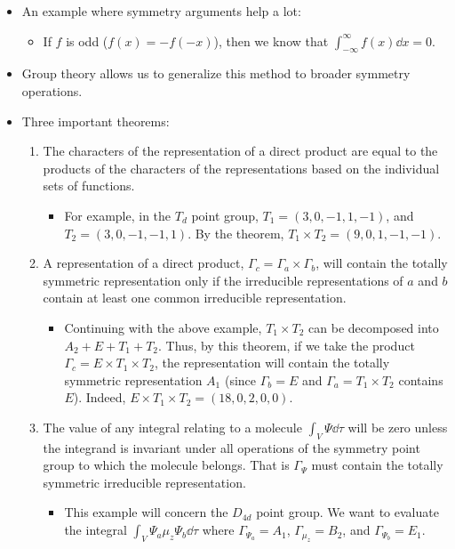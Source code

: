 \documentclass[../notes.tex]{subfiles}
\begin{document}
\begin{itemize}
\begin{itemize}
    \end{itemize}
    \item An example where symmetry arguments help a lot:
    \begin{itemize}
        \item If $f$ is odd ($f(x)=-f(-x)$), then we know that $\int_{-\infty}^\infty f(x)\dd{x}=0$.
    \end{itemize}
    \item Group theory allows us to generalize this method to broader symmetry operations.
    \item Three important theorems:
    \begin{enumerate}
        \item The characters of the representation of a direct product are equal to the products of the characters of the representations based on the individual sets of functions.
        \begin{itemize}
            \item For example, in the $T_d$ point group, $T_1=(3,0,-1,1,-1)$, and $T_2=(3,0,-1,-1,1)$. By the theorem, $T_1\times T_2=(9,0,1,-1,-1)$.
        \end{itemize}
        \item A representation of a direct product, $\Gamma_c=\Gamma_a\times\Gamma_b$, will contain the totally symmetric representation only if the irreducible representations of $a$ and $b$ contain at least one common irreducible representation.
        \begin{itemize}
            \item Continuing with the above example, $T_1\times T_2$ can be decomposed into $A_2+E+T_1+T_2$. Thus, by this theorem, if we take the product $\Gamma_c=E\times T_1\times T_2$, the representation will contain the totally symmetric representation $A_1$ (since $\Gamma_b=E$ and $\Gamma_a=T_1\times T_2$ contains $E$). Indeed, $E\times T_1\times T_2=(18,0,2,0,0)$.
        \end{itemize}
        \item The value of any integral relating to a molecule $\int_V\Psi\dd{\tau}$ will be zero unless the integrand is invariant under all operations of the symmetry point group to which the molecule belongs. That is $\Gamma_\Psi$ must contain the totally symmetric irreducible representation.
        \begin{itemize}
            \item This example will concern the $D_{4d}$ point group. We want to evaluate the integral $\int_V\Psi_a\mu_z\Psi_b\dd{\tau}$ where $\Gamma_{\Psi_a}=A_1$, $\Gamma_{\mu_z}=B_2$, and $\Gamma_{\Psi_b}=E_1$.

\end{itemize}
\end{enumerate}
\end{itemize}
\end{document}
